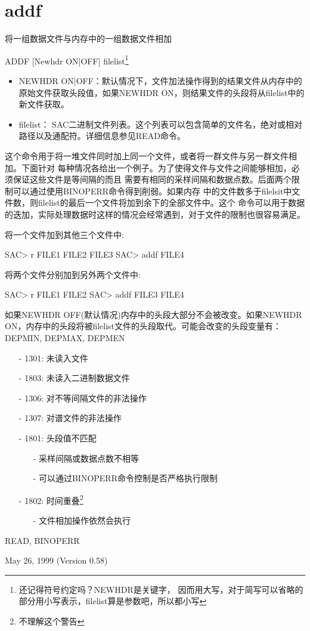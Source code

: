 \section{addf}
\label{cmd:addf}

将一组数据文件与内存中的一组数据文件相加

ADDF [Newhdr ON|OFF] filelist\footnote{还记得符号约定吗？NEWHDR是关键字，
因而用大写，对于简写可以省略的部分用小写表示，filelist算是参数吧，所以都小写}

\begin{itemize}
\item NEWHDR ON|OFF：默认情况下，文件加法操作得到的结果文件从内存中的原始文件获取头段值，如果NEWHDR ON，则结果文件的头段将从filelist中的新文件获取。
\item filelist： SAC二进制文件列表。这个列表可以包含简单的文件名，绝对或相对路径以及通配符。详细信息参见READ命令。
\end{itemize}

这个命令用于将一堆文件同时加上同一个文件，或者将一群文件与另一群文件相加。下面针对
每种情况各给出一个例子。为了使得文件与文件之间能够相加，必须保证这些文件是等间隔的而且
需要有相同的采样间隔和数据点数。后面两个限制可以通过使用BINOPERR命令得到削弱。如果内存
中的文件数多于filelsit中文件数，则filelist的最后一个文件将加到余下的全部文件中。这个
命令可以用于数据的迭加，实际处理数据时这样的情况会经常遇到，对于文件的限制也很容易满足。

将一个文件加到其他三个文件中:
\begin{SACCode}
SAC> r FILE1 FILE2 FILE3
SAC> addf FILE4
\end{SACCode}
将两个文件分别加到另外两个文件中:
\begin{SACCode}
SAC> r FILE1 FILE2
SAC> addf FILE3 FILE4
\end{SACCode}

如果NEWHDR OFF(默认情况)内存中的头段大部分不会被改变。如果NEWHDR ON，内存中的头段将被filelist文件的头段取代。可能会改变的头段变量有：DEPMIN, DEPMAX, DEPMEN

\begin{itemize}
\item[-]1301: 未读入文件
\item[-]1803: 未读入二进制数据文件
\item[-]1306: 对不等间隔文件的非法操作
\item[-]1307: 对谱文件的非法操作
\item[-]1801: 头段值不匹配
	\begin{itemize}
	\item[-]采样间隔或数据点数不相等
	\item[-]可以通过BINOPERR命令控制是否严格执行限制
	\end{itemize}
\end{itemize}




\begin{itemize}
\item[-]1802: 时间重叠\footnote{不理解这个警告}
	\begin{itemize}
  	\item[-]文件相加操作依然会执行
	\end{itemize}
\end{itemize}

READ, BINOPERR

May 26, 1999 (Version 0.58)
